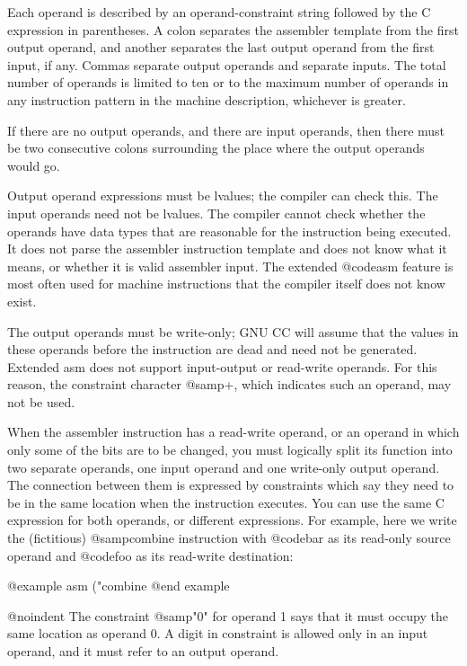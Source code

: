 {Each operand is described by an operand-constraint string followed by the C
expression in parentheses.  A colon separates the assembler template from
the first output operand, and another separates the last output operand
from the first input, if any.  Commas separate output operands and separate
inputs.  The total number of operands is limited to ten or to the maximum
number of operands in any instruction pattern in the machine description,
whichever is greater.

If there are no output operands, and there are input operands, then there
must be two consecutive colons surrounding the place where the output
operands would go.

Output operand expressions must be lvalues; the compiler can check this.
The input operands need not be lvalues.  The compiler cannot check whether
the operands have data types that are reasonable for the instruction being
executed.  It does not parse the assembler instruction template and does
not know what it means, or whether it is valid assembler input.  The
extended @code{asm} feature is most often used for machine instructions
that the compiler itself does not know exist.

The output operands must be write-only; GNU CC will assume that the values
in these operands before the instruction are dead and need not be
generated.  Extended asm does not support input-output or read-write
operands.  For this reason, the constraint character @samp{+}, which
indicates such an operand, may not be used.

When the assembler instruction has a read-write operand, or an operand
in which only some of the bits are to be changed, you must logically
split its function into two separate operands, one input operand and one
write-only output operand.  The connection between them is expressed by
constraints which say they need to be in the same location when the
instruction executes.  You can use the same C expression for both
operands, or different expressions.  For example, here we write the
(fictitious) @samp{combine} instruction with @code{bar} as its read-only
source operand and @code{foo} as its read-write destination:

@example
asm ("combine %
@end example

@noindent
The constraint @samp{"0"} for operand 1 says that it must occupy the same
location as operand 0.  A digit in constraint is allowed only in an input
operand, and it must refer to an output operand.

}
